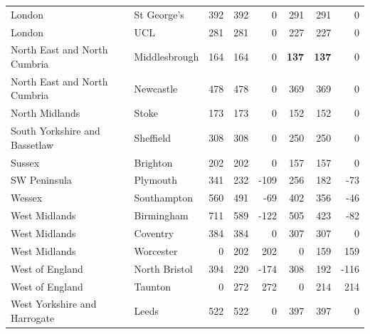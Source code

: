 \begin{landscape}
\begin{table}[htbp]
\begin{tabular}{ll|rrr|rrr}
    London & St George’s & 392 & 392 & 0 & 291 & 291 & 0 \\
    London & UCL & 281 & 281 & 0 & 227 & 227 & 0 \\
    North East and North Cumbria & Middlesbrough & 164 & 164 & 0 & \textbf{137} & \textbf{137} & 0 \\
    North East and North Cumbria & Newcastle & 478 & 478 & 0 & 369 & 369 & 0 \\
    North Midlands & Stoke & 173 & 173 & 0 & 152 & 152 & 0 \\
    South Yorkshire and Bassetlaw & Sheffield & 308 & 308 & 0 & 250 & 250 & 0 \\
    Sussex & Brighton & 202 & 202 & 0 & 157 & 157 & 0 \\
    SW Peninsula & Plymouth & 341 & 232 & -109 & 256 & 182 & -73 \\
    Wessex & Southampton & 560 & 491 & -69 & 402 & 356 & -46 \\
    West Midlands & Birmingham & 711 & 589 & -122 & 505 & 423 & -82 \\
    West Midlands & Coventry & 384 & 384 & 0 & 307 & 307 & 0 \\
    West Midlands & Worcester & 0 & 202 & 202 & 0 & 159 & 159 \\
    West of England & North Bristol & 394 & 220 & -174 & 308 & 192 & -116 \\
    West of England & Taunton & 0 & 272 & 272 & 0 & 214 & 214 \\
    West Yorkshire and Harrogate & Leeds & 522 & 522 & 0 & 397 & 397 & 0 \\
    \hline
    \end{tabular}
\end{table}
\end{landscape}